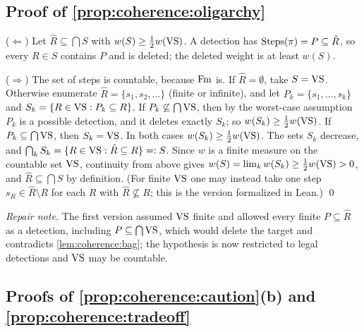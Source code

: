 \subsection{Proof of \texorpdfstring{\cref{prop:coherence:oligarchy}}{the oligarchy proposition}}\label{app:coherence:oligarchy}

($\Leftarrow$) Let $\hat R\subseteq\bigcap S$ with $w(S)\ge\frac12w(\mathrm{VS})$. A detection has $\mathrm{Steps}(\pi)=P\subseteq\hat R$, so every $R\in S$ contains $P$ and is deleted; the deleted weight is at least $w(S)$.

($\Rightarrow$) The set of steps is countable, because $\mathrm{Fm}$ is. If $\hat R=\emptyset$, take $S=\mathrm{VS}$. Otherwise enumerate $\hat R=\{s_1,s_2,\dots\}$ (finite or infinite), and let $P_k=\{s_1,\dots,s_k\}$ and $S_k=\{R\in\mathrm{VS}:P_k\subseteq R\}$. If $P_k\not\subseteq\bigcap\mathrm{VS}$, then by the worst-case assumption $P_k$ is a possible detection, and it deletes exactly $S_k$; so $w(S_k)\ge\frac12w(\mathrm{VS})$. If $P_k\subseteq\bigcap\mathrm{VS}$, then $S_k=\mathrm{VS}$. In both cases $w(S_k)\ge\frac12w(\mathrm{VS})$. The sets $S_k$ decrease, and $\bigcap_kS_k=\{R\in\mathrm{VS}:\hat R\subseteq R\}=:S$. Since $w$ is a finite measure on the countable set $\mathrm{VS}$, continuity from above gives $w(S)=\lim_kw(S_k)\ge\frac12w(\mathrm{VS})>0$, and $\hat R\subseteq\bigcap S$ by definition. (For finite $\mathrm{VS}$ one may instead take one step $s_R\in\hat R\setminus R$ for each $R$ with $\hat R\not\subseteq R$; this is the version formalized in Lean.) \qed

\emph{Repair note.} The first version assumed $\mathrm{VS}$ finite and allowed every finite $P\subseteq\hat R$ as a detection, including $P\subseteq\bigcap\mathrm{VS}$, which would delete the target and contradicts \cref{lem:coherence:bag}; the hypothesis is now restricted to legal detections and $\mathrm{VS}$ may be countable.

\subsection{Proofs of \texorpdfstring{\cref{prop:coherence:caution}(b) and \cref{prop:coherence:tradeoff}}{the caution and trade-off propositions}}\label{app:coherence:tradeoff}

